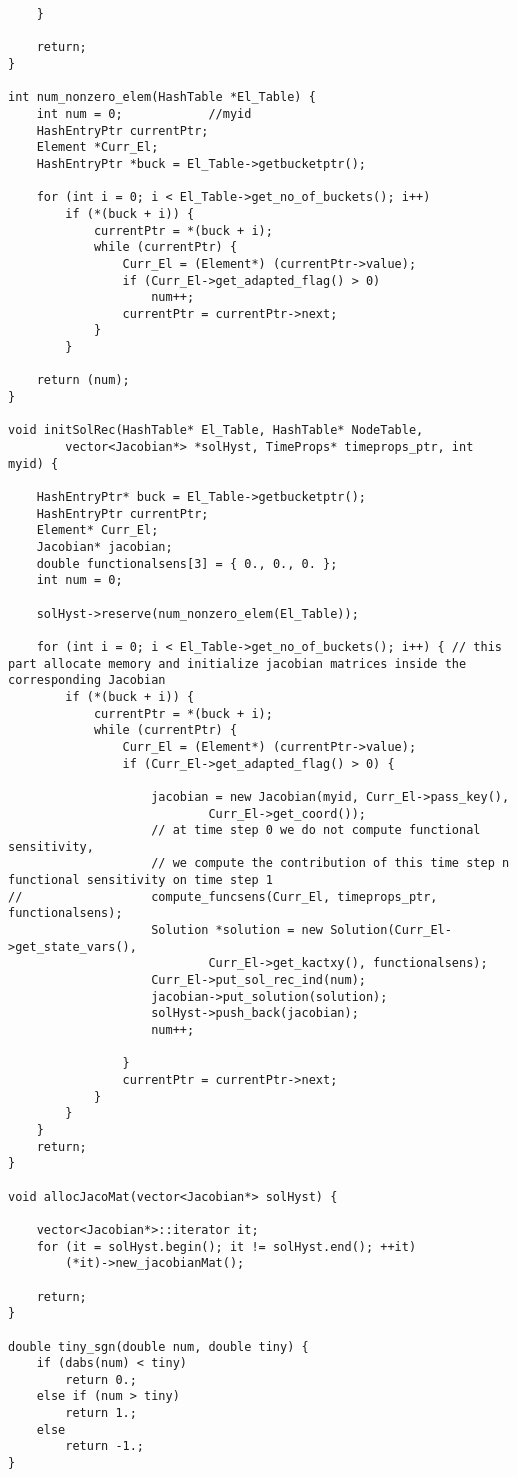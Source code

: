 \documentclass[a4paper,10pt]{article}
\begin{document}
\begin{lstlisting}
	}

	return;
}

int num_nonzero_elem(HashTable *El_Table) {
	int num = 0;			//myid
	HashEntryPtr currentPtr;
	Element *Curr_El;
	HashEntryPtr *buck = El_Table->getbucketptr();

	for (int i = 0; i < El_Table->get_no_of_buckets(); i++)
		if (*(buck + i)) {
			currentPtr = *(buck + i);
			while (currentPtr) {
				Curr_El = (Element*) (currentPtr->value);
				if (Curr_El->get_adapted_flag() > 0)
					num++;
				currentPtr = currentPtr->next;
			}
		}

	return (num);
}

void initSolRec(HashTable* El_Table, HashTable* NodeTable,
		vector<Jacobian*> *solHyst, TimeProps* timeprops_ptr, int myid) {

	HashEntryPtr* buck = El_Table->getbucketptr();
	HashEntryPtr currentPtr;
	Element* Curr_El;
	Jacobian* jacobian;
	double functionalsens[3] = { 0., 0., 0. };
	int num = 0;

	solHyst->reserve(num_nonzero_elem(El_Table));

	for (int i = 0; i < El_Table->get_no_of_buckets(); i++) { // this part allocate memory and initialize jacobian matrices inside the corresponding Jacobian
		if (*(buck + i)) {
			currentPtr = *(buck + i);
			while (currentPtr) {
				Curr_El = (Element*) (currentPtr->value);
				if (Curr_El->get_adapted_flag() > 0) {

					jacobian = new Jacobian(myid, Curr_El->pass_key(),
							Curr_El->get_coord());
					// at time step 0 we do not compute functional sensitivity,
					// we compute the contribution of this time step n functional sensitivity on time step 1
//					compute_funcsens(Curr_El, timeprops_ptr, functionalsens);
					Solution *solution = new Solution(Curr_El->get_state_vars(),
							Curr_El->get_kactxy(), functionalsens);
					Curr_El->put_sol_rec_ind(num);
					jacobian->put_solution(solution);
					solHyst->push_back(jacobian);
					num++;

				}
				currentPtr = currentPtr->next;
			}
		}
	}
	return;
}

void allocJacoMat(vector<Jacobian*> solHyst) {

	vector<Jacobian*>::iterator it;
	for (it = solHyst.begin(); it != solHyst.end(); ++it)
		(*it)->new_jacobianMat();

	return;
}

double tiny_sgn(double num, double tiny) {
	if (dabs(num) < tiny)
		return 0.;
	else if (num > tiny)
		return 1.;
	else
		return -1.;
}


\end{lstlisting}
\end{document}
